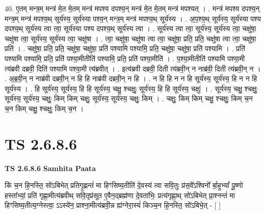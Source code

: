 \documentclass[17pt]{extarticle}
\begin{document}
40. ए॒तम् मन्त्र॒म् मन्त्र॑ मे॒त मे॒तम् मन्त्र॑ मपश्य दपश्य॒न् मन्त्र॑ मे॒त मे॒तम् मन्त्र॑ मपश्यत् । . मन्त्र॑ मपश्य दपश्य॒न् मन्त्र॒म् मन्त्र॑ मपश्य॒थ् सूर्य॑स्य॒ सूर्य॑स्या पश्य॒न् मन्त्र॒म् मन्त्र॑ मपश्य॒थ् सूर्य॑स्य । . अ॒प॒श्य॒थ् सूर्य॑स्य॒ सूर्य॑स्या पश्य दपश्य॒थ् सूर्य॑स्य त्वा त्वा॒ सूर्य॑स्या पश्य दपश्य॒थ् सूर्य॑स्य त्वा । . सूर्य॑स्य त्वा त्वा॒ सूर्य॑स्य॒ सूर्य॑स्य त्वा॒ चक्षु॑षा॒ चक्षु॑षा त्वा॒ सूर्य॑स्य॒ सूर्य॑स्य त्वा॒ चक्षु॑षा । . त्वा॒ चक्षु॑षा॒ चक्षु॑षा त्वा त्वा॒ चक्षु॑षा॒ प्रति॒ प्रति॒ चक्षु॑षा त्वा त्वा॒ चक्षु॑षा॒ प्रति॑ । . चक्षु॑षा॒ प्रति॒ प्रति॒ चक्षु॑षा॒ चक्षु॑षा॒ प्रति॑ पश्यामि पश्यामि॒ प्रति॒ चक्षु॑षा॒ चक्षु॑षा॒ प्रति॑ पश्यामि । . प्रति॑ पश्यामि पश्यामि॒ प्रति॒ प्रति॑ पश्या॒मीतीति॑ पश्यामि॒ प्रति॒ प्रति॑ पश्या॒मीति॑ । . प॒श्या॒मीतीति॑ पश्यामि पश्या॒मी त्य॑ब्रवी दब्रवी॒ दिति॑ पश्यामि पश्या॒मी त्य॑ब्रवीत् । . इत्य॑ब्रवी दब्रवी॒ दिती त्य॑ब्रवी॒न् न नाब्र॑वी॒ दिती त्य॑ब्रवी॒न् न । . अ॒ब्र॒वी॒न् न नाब्र॑वी दब्रवी॒न् न हि हि नाब्र॑वी दब्रवी॒न् न हि । . न हि हि न न हि सूर्य॑स्य॒ सूर्य॑स्य॒ हि न न हि सूर्य॑स्य । . हि सूर्य॑स्य॒ सूर्य॑स्य॒ हि हि सूर्य॑स्य॒ चक्षु॒ श्चक्षुः॒ सूर्य॑स्य॒ हि हि सूर्य॑स्य॒ चक्षुः॑ । . सूर्य॑स्य॒ चक्षु॒ श्चक्षुः॒ सूर्य॑स्य॒ सूर्य॑स्य॒ चक्षुः॒ किम् किम् चक्षुः॒ सूर्य॑स्य॒ सूर्य॑स्य॒ चक्षुः॒ किम् । . चक्षुः॒ किम् किम् चक्षु॒ श्चक्षुः॒ किम् च॒न च॒न किम् चक्षु॒ श्चक्षुः॒ किम् च॒न । \newline
\pagebreak
{}
\section*{ TS 2.6.8.6 }

\textbf{TS 2.6.8.6 } \newline
\textbf{Samhita Paata} \newline

किं च॒न हि॒नस्ति॒ सो॑ऽबिभेत् प्रतिगृ॒ह्णन्तं॑ मा हिꣳसिष्य॒तीति॑ दे॒वस्य॑ त्वा सवि॒तुः प्र॑स॒वे᳚ऽश्विनो᳚ र्बा॒हुभ्यां᳚ पू॒ष्णो हस्ता᳚भ्यां॒ प्रति॑ गृह्णा॒मीत्य॑ब्रवीथ् सवि॒तृप्र॑सूत ए॒वैन॒द्ब्रह्म॑णा दे॒वता॑भिः॒ प्रत्य॑गृह्णा॒थ् सो॑ऽबिभेत् प्रा॒श्नन्तं॑ मा हिꣳसिष्य॒तीत्य॒ग्नेस्त्वा॒ ऽऽस्ये॑न॒ प्राश्ना॒मीत्य॑ब्रवी॒न्न ह्य॑ग्नेरा॒स्यं॑ किञ्च॒न हि॒नस्ति॒ सो॑ऽबिभे॒त् - [  ] \newline
\end{document}

